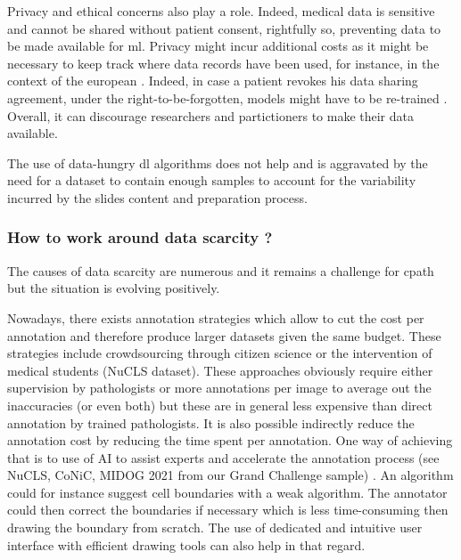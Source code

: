 Privacy and ethical concerns also play a role. Indeed, medical data is sensitive and cannot be shared without patient consent, rightfully so, preventing data to be made available for \acrlong{ml}. Privacy might incur additional costs as it might be necessary to keep track where data records have been used, for instance, in the context of the european . Indeed, in case a patient revokes his data sharing agreement, under the right-to-be-forgotten, models might have to be re-trained \parencite{humerick2017taking}. Overall, it can discourage researchers and partictioners to make their data available. 

The use of data-hungry \acrlong{dl} algorithms does not help and is aggravated by the need for a dataset to contain enough samples to account for the variability incurred by the slides content and preparation process. 


\subsubsection{How to work around data scarcity ?}
\label{sssec:backdp:ds-solutions}

The causes of data scarcity are numerous and it remains a challenge for \acrlong{cpath} but the situation is evolving positively. 

Nowadays, there exists annotation strategies which allow to cut the cost per annotation and therefore produce larger datasets given the same budget. These strategies include crowdsourcing through citizen science \parencite{peplow2016citizen} or the intervention of medical students (\eg NuCLS dataset). These approaches obviously require either supervision by pathologists or more annotations per image to average out the inaccuracies (or even both) but these are in general less expensive than direct annotation by trained pathologists. It is also possible indirectly reduce the annotation cost by reducing the time spent per annotation. One way of achieving that is to use of AI to assist experts and accelerate the annotation process (see NuCLS, CoNiC, MIDOG 2021 from our Grand Challenge sample) \parencite{chai2020human}. An algorithm could for instance suggest cell boundaries with a weak algorithm. The annotator could then correct the boundaries if necessary which is less time-consuming then drawing the boundary from scratch. The use of dedicated and intuitive user interface with efficient drawing tools can also help in that regard.  


